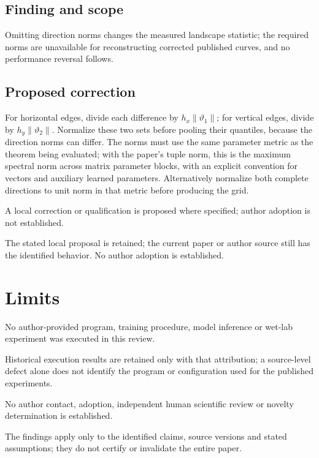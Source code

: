 \documentclass[11pt]{article}
\begin{document}
\subsection*{Finding and scope}

Omitting direction norms changes the measured landscape statistic; the required norms are unavailable for reconstructing corrected published curves, and no performance reversal follows.

\subsection*{Proposed correction}

For horizontal edges, divide each difference by \(h_x\|\vartheta_1\|\); for vertical edges, divide by \(h_y\|\vartheta_2\|\). Normalize these two sets before pooling their quantiles, because the direction norms can differ. The norms must use the same parameter metric as the theorem being evaluated; with the paper’s tuple norm, this is the maximum spectral norm across matrix parameter blocks, with an explicit convention for vectors and auxiliary learned parameters. Alternatively normalize both complete directions to unit norm in that metric before producing the grid.

A local correction or qualification is proposed where specified; author adoption is not established.

The stated local proposal is retained; the current paper or author source still has the identified behavior. No author adoption is established.

\section*{Limits}

No author-provided program, training procedure, model inference or wet-lab experiment was executed in this review.\par

Historical execution results are retained only with that attribution; a source-level defect alone does not identify the program or configuration used for the published experiments.\par

No author contact, adoption, independent human scientific review or novelty determination is established.\par

The findings apply only to the identified claims, source versions and stated assumptions; they do not certify or invalidate the entire paper.\par
\end{document}

